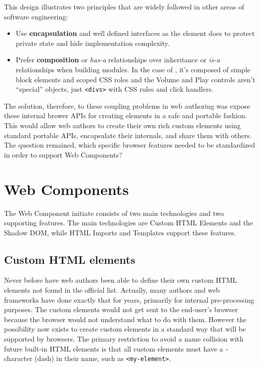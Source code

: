 This design illustrates two principles that are widely followed in other areas of software engineering:

\begin{itemize}
\item Use \textbf{encapsulation} and well defined interfaces as the  element does to protect private state and hide implementation complexity.
\item Prefer \textbf{composition} or \textit{has-a} relationships over inheritance or \textit{is-a} relationships when building modules. 
In the case of , it's composed of simple block elements and scoped CSS roles and the Volume and Play controls aren't ``special'' objects, just \texttt{<divs>} with CSS rules and click handlers.
\end{itemize}

The solution, therefore, to these coupling problems in web authoring was expose these internal brower APIs for creating elements in a safe and portable fashion. 
This would allow web authors to create their own rich custom elements using standard portable APIs, encapsulate their internals, and share them with others.
The question remained, which specific browser features needed to be standardized in order to support Web Components?

\section{Web Components}

The Web Component initiate consists of two main technologies and two supporting features. The main technologies are Custom HTML Elements and the Shadow DOM, while HTML Imports and Templates support these features.

\subsection{Custom HTML elements}
Never before have web authors been able to define their own custom HTML elements not found in the official list.
Actually, many authors and web frameworks have done exactly that for years, primarily for internal pre-processing purposes.
The custom elements would not get sent to the end-user's browser because the browser would not understand what to do with them.
However the possibility now exists to create custom elements in a standard way that will be supported by browsers.
The primary restriction to avoid a name collision with future built-in HTML elements is that all custom elements must have a \texttt{-} character (dash) in their name, such as \texttt{<my-element>}.

